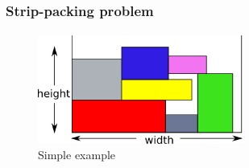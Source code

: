 \begin{frame}
    \frametitle{Strip-packing problem}
    \framesubtitle{}
    \begin{figure}[h!t]
        \includegraphics[width=0.6\textwidth]{../report/img/ia-strip_packing.png}
        \caption{Simple example}
    \end{figure}
\end{frame}
